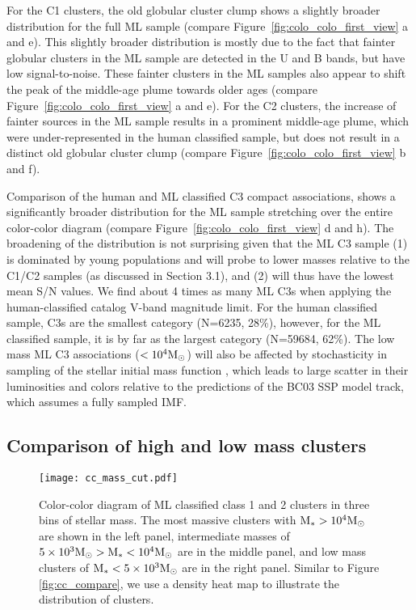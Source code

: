 \documentclass[]{aastex631}
\begin{document}
For the C1 clusters, the old globular cluster clump shows a slightly broader distribution for the full ML sample (compare Figure~\ref{fig:colo_colo_first_view} a and e). This slightly broader distribution is mostly due to the fact that fainter globular clusters in the ML sample are detected in the U and B bands, but have low signal-to-noise.
These fainter clusters in the ML samples also appear to shift the peak of the middle-age plume towards older ages (compare Figure~\ref{fig:colo_colo_first_view} a and e).   For the C2 clusters, the increase of fainter sources in the ML sample results in a prominent middle-age plume, which were under-represented in the human classified sample, but does not result in a distinct old globular cluster clump (compare Figure~\ref{fig:colo_colo_first_view} b and f).

Comparison of the human and ML classified C3 compact associations, shows a significantly broader distribution for the ML sample stretching over the entire color-color diagram (compare Figure~\ref{fig:colo_colo_first_view} d and h).    The broadening of the distribution is not surprising given that the ML C3 sample (1) is dominated by young populations and will probe to lower masses relative to the C1/C2 samples (as discussed in Section 3.1), and (2) will thus have the lowest mean S/N values.   We find about 4 times as many ML C3s when applying the human-classified catalog V-band magnitude limit. For the human classified sample, C3s are the smallest category (N=6235, 28\%), however, for the ML classified sample, it is by far as the largest category (N=59684, 62\%).
The low mass ML C3 associations (${\rm <10^4 M_{\odot} }$) will also be affected by stochasticity in sampling of the stellar initial mass function \citep[e.g.][]{fouesneau_accounting_2010,popescu_age_2012,de_meulenaer_deriving_2013,krumholz_star_2015, OD2022}, which leads to large scatter in their luminosities and colors relative to the predictions of the BC03 SSP model track, which assumes a fully sampled IMF.

\subsection{Comparison of high and low mass clusters}\label{ssect:cc_mag_m_star}
%
\begin{figure*} 
\texttt{[image: cc\_mass\_cut.pdf]}
 \caption{Color-color diagram of ML classified class 1 and 2 clusters in three bins of stellar mass. The most massive clusters with ${\rm M_{*} > 10^4 M_{\odot}}$ are shown in the left panel, intermediate masses of ${\rm 5\times10^3 M_{\odot} > M_{*} < 10^4 M_{\odot}}$ are in the middle panel, and low mass clusters of ${\rm M_{*} < 5\times10^3 M_{\odot}}$ are in the right panel. Similar to Figure\,\ref{fig:cc_compare}, we use a density heat map to illustrate the distribution of clusters.}
 \label{fig:cc_mass_cut}
\end{figure*}
%
\end{document}
